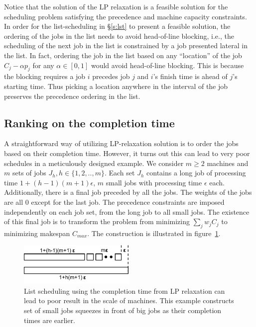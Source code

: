 Notice that the solution of the LP relaxation is a feasible solution for the scheduling problem satisfying the precedence and machine capacity constraints. In order for the list-scheduling in \S\ref{s:lst} to present a feasible solution, the ordering of the jobs in the list needs to avoid head-of-line blocking, i.e., the scheduling of the next job in the list is constrained by a job presented lateral in the list. In fact, ordering the job in the list based on any ``location'' of the job $C_j - \alpha p_j$ for any $\alpha \in [0,1]$ would avoid head-of-line blocking. This is because the blocking requires a job $i$ precedes job $j$ and $i$'s finish time is ahead of $j$'s starting time. Thus picking a location anywhere in the interval of the job preserves the precedence ordering in the list.

\subsection{Ranking on the completion time} \label{s:lpc}
A straightforward way of utilizing LP-relaxation solution is to order the jobs based on their completion time. However, it turns out this can lead to very poor schedules in a meticulously designed example. We consider $m \geq 2$ machines and $m$ sets of jobs $J_h, h\in\{1,2,..,m\}$. Each set $J_h$ contains a long job of processing time $1 + (h-1)(m+1)\epsilon$, $m$ small jobs with processing time $\epsilon$ each. Additionally, there is a final job preceded by all the jobs. The weights of the jobs are all $0$ except for the last job. The precedence constraints are imposed independently on each job set, from the long job to all small jobs. The existence of this final job is to transform the problem from minimizing $\sum_jw_jC_j$ to minimizing makespan $C_{max}$. The construction is illustrated in figure~\ref{fig:lpc}.

\begin{figure}[h]
\centering
\includegraphics[width=0.5\textwidth]{figs/lpc.pdf}
\caption{List scheduling using the completion time from LP relaxation can lead to poor result in the scale of machines. This example constructs set of small jobs squeezes in front of big jobs as their completion times are earlier.}
\label{fig:lpc}
\end{figure}

